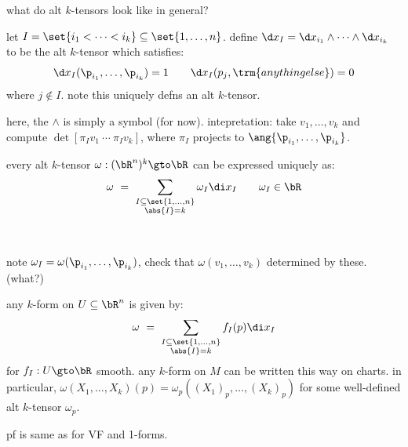 what do alt $k$-tensors look like in general?
\begin{defn}
	let $I=\set{i_{1}<\dots<i_{k}}\subseteq\set{1,\dots,n}$.
	define $\d x_{I}=\d x_{i_{1}}\wedge\cdots\wedge \d x_{i_{k}}$
	to be the alt $k$-tensor which satisfies:
	\begin{equation*}
		\d x_{I}(\p_{i_{1}},\dots,\p_{i_{k}}) = 1 \qquad
		\d x_{I}(p_{j},\trm{ anything else }) = 0
	\end{equation*}
	where $j\notin I$. note this uniquely defns an alt $k$-tensor.
\end{defn}
here, the $\wedge$ is simply a symbol (for now).
intepretation: take $v_{1},\dots,v_{k}$ and compute
$\det[\pi_{I}v_{1} \ \cdots \ \pi_{I}v_{k}]$, where $\pi_{I}$ projects
to $\ang{\p_{i_{1}},\dots,\p_{i_{k}}}$.

\begin{lm}
	every alt $k$-tensor $\omega:(\bR^{n})^{k}\gto\bR$ can be expressed
	uniquely as:
	\begin{equation*}
		\omega \ = \ \sum_{\substack{I\subseteq\set{1,\dots,n}\\\abs{I}=k}}\omega_{I}\di x_{I} \qquad
		\omega_{I}\in\bR
	\end{equation*}
\end{lm} \

\begin{pf}
	note $\omega_{I}=\omega(\p_{i_{1}},\dots,\p_{i_{k}})$,
	check that $\omega(v_{1},\dots,v_{k})$ determined by these. (what?)
\end{pf}

\newpage
\begin{prop}
	any $k$-form on $U\subseteq\bR^{n}$ is given by:
	\begin{equation*}
		\omega \ = \ \sum_{\substack{I\subseteq\set{1,\dots,n}\\\abs{I}=k}}
		f_{I}(p)\di x_{I}
	\end{equation*}
	for $f_{I}:U\gto\bR$ smooth.
	any $k$-form on $M$ can be written this way on charts.
	in particular, $\omega(X_{1},\dots,X_{k})(p)=\omega_{p}((X_{1})_{p},\dots,(X_{k})_{p})$
	for some well-defined alt $k$-tensor $\omega_{p}$.
\end{prop}
pf is same as for VF and 1-forms.
